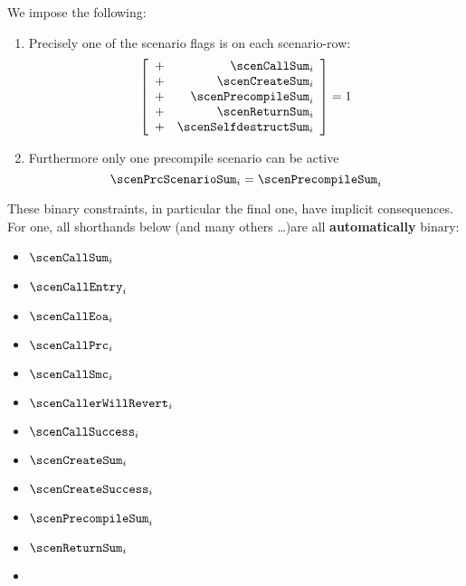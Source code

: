 \begin{center}
\end{center}
We impose the following:
\begin{enumerate}[resume]
	\item Precisely one of the scenario flags is on each scenario-row:
		\[
			\left[ \begin{array}{cr}
				+ & \scenCallSum          _{i} \\
				+ & \scenCreateSum        _{i} \\
				+ & \scenPrecompileSum    _{i} \\
				+ & \scenReturnSum        _{i} \\
				+ & \scenSelfdestructSum  _{i} \\
			\end{array} \right]
			= 1
		\]
	\item Furthermore only one precompile scenario can be active
		\[
			\scenPrcScenarioSum_{i} = \scenPrecompileSum_{i}
		\]
\end{enumerate}
\saNote{} These binary constraints, in particular the final one, have implicit consequences. For one, all shorthands below (and many others \dots)are all \textbf{automatically} binary:
\begin{multicols}{2}
	\begin{itemize}
		\item $\scenCallSum_{i}$
		\item $\scenCallEntry_{i}$
		\item $\scenCallEoa_{i}$
		\item $\scenCallPrc_{i}$
		\item $\scenCallSmc_{i}$
		\item $\scenCallerWillRevert_{i}$
		\item $\scenCallSuccess_{i}$
		\item $\scenCreateSum_{i}$
		\item $\scenCreateSuccess_{i}$
		\item $\scenPrecompileSum_{i}$
		\item $\scenReturnSum_{i}$
		\item[\vspace{\fill}]
	\end{itemize}
\end{multicols}



